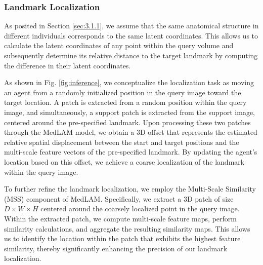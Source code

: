 \documentclass[times,twocolumn,final]{elsarticle}
\begin{document}
\subsubsection{Landmark Localization}
\par As posited in Section \ref{sec:3.1.1}, we assume that the same anatomical structure in different individuals corresponds to the same latent coordinates. This allows us to calculate the latent coordinates of any point within the query volume and subsequently determine its relative distance to the target landmark by computing the difference in their latent coordinates. 
\par As shown in Fig. \ref{fig:inference}, we conceptualize the localization task as moving an agent from a randomly initialized position in the query image toward the target location. A patch is extracted from a random position within the query image, and simultaneously, a support patch is extracted from the support image, centered around the pre-specified landmark. Upon processing these two patches through the MedLAM model, we obtain a 3D offset that represents the estimated relative spatial displacement between the start and target positions and the multi-scale feature vectors of the pre-specified landmark. By updating the agent's location based on this offset, we achieve a coarse localization of the landmark within the query image. 

\par To further refine the landmark localization, we employ the Multi-Scale Similarity (MSS) component of MedLAM. Specifically, we extract a 3D patch of size $D\times W\times H$ centered around the coarsely localized point in the query image. Within the extracted patch, we compute multi-scale feature maps, perform similarity calculations, and aggregate the resulting similarity maps. This allows us to identify the location within the patch that exhibits the highest feature similarity, thereby significantly enhancing the precision of our landmark localization.
\end{document}
